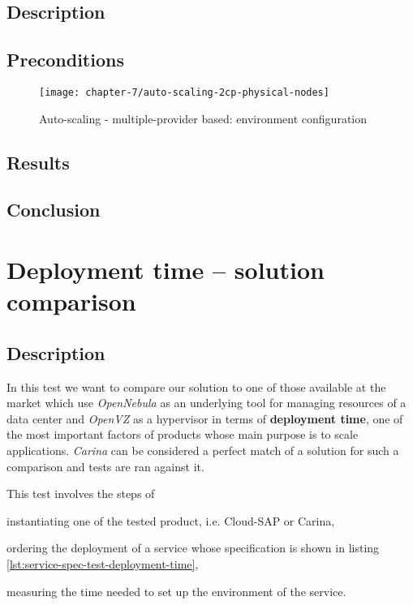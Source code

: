 \subsection*{Description}
\subsection*{Preconditions}
\begin{figure}[!ht]
  \begin{center}
    \texttt{[image: chapter-7/auto-scaling-2cp-physical-nodes]}
  \end{center}
  \caption{Auto-scaling - multiple-provider based: environment configuration}
  \label{eval:auto-scaling-2cp-physical-nodes}
\end{figure}

\subsection*{Results}
\subsection*{Conclusion}

\section{Deployment time -- solution comparison}
\subsection*{Description}
In this test we want to compare our solution to one of those available at the market which use \emph{OpenNebula} as an underlying tool for managing resources of a data center and \emph{OpenVZ} as a hypervisor in terms of \textbf{deployment time}, one of the most important factors of products whose main purpose is to scale applications.
\emph{Carina} \cite{Carina} can be considered a perfect match of a solution for such a comparison and tests are ran against it.

This test involves the steps of
  \begin{inparaenum}[i)]
    \item instantiating one of the tested product, i.e. Cloud-SAP or Carina,
    \item ordering the deployment of a service whose specification is shown in listing \ref{lst:service-spec-test-deployment-time},
    \item measuring the time needed to set up the environment of the service.
  \end{inparaenum}

